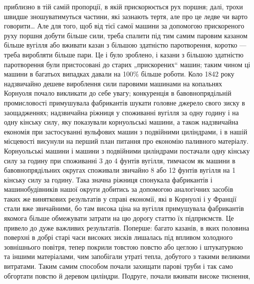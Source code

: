 приблизно в тій самій пропорції, в якій прискорюється рух поршня;
далі, трохи швидше зношуватимуться частини, які зазнають
тертя, але про це ледве чи варто говорити\dots{} Але для того, щоб
від тієї самої машини за допомогою прискореного руху поршня
добути більше сили, треба спалити під тим самим паровим казаном більше вугілля або вживати казан з
більшою здатністю паротворення, коротко — треба виробляти більше пари. Це і було
зроблено, і казани з більшою здатністю паротворення були пристосовані до старих „прискорених“ машин;
таким чином ці машини в багатьох випадках давали на 100\% більше роботи. Коло
1842 року надзвичайно дешеве вироблення сили паровими машинами на копальнях Корнуоля почало
викликати до себе увагу;
конкуренція в бавовнопрядільній промисловості примушувала
фабрикантів шукати головне джерело свого зиску в заощадженнях; надзвичайна ріжниця у споживанні
вугілля за одну годину
і на одну кінську силу, яку показували корнуольські машини,
а також надзвичайна економія при застосуванні вульфових машин
з подвійними циліндрами, і в нашій місцевості висунули на перший
план питання про економію паливного матеріалу. Корнуольські
машини і машини з подвійними циліндрами постачали одну кінську
силу за годину при споживанні 3 до 4 фунтів вугілля, тимчасом як машини в бавовнопрядільних
округах споживали звичайно 8 або 12 фунтів вугілля на 1 кінську силу за годину.
Така значна ріжниця спонукала фабрикантів і машинобудівників
нашої округи добитись за допомогою аналогічних засобів таких же
виняткових результатів у справі економії, які в Корнуолі і у Франції стали вже звичайними, бо там
висока ціна на вугілля примушувала фабрикантів якомога більше обмежувати затрати на цю дорогу статтю
їх підприємств. Це привело до дуже важливих результатів. Поперше: багато казанів, в яких половина
поверхні в добрі
старі часи високих зисків лишалась під впливом холодного зовнішнього повітря, тепер покрили товстою
повстю або цеглою і штукатуркою та іншими матеріалами, чим запобігали утраті тепла,
добутого з такими великими витратами. Таким самим способом
почали захищати парові труби і так само обгортати повстю й деревом циліндри. Подруге, почали
вживати високе тиснення,
\parbreak{}  %
